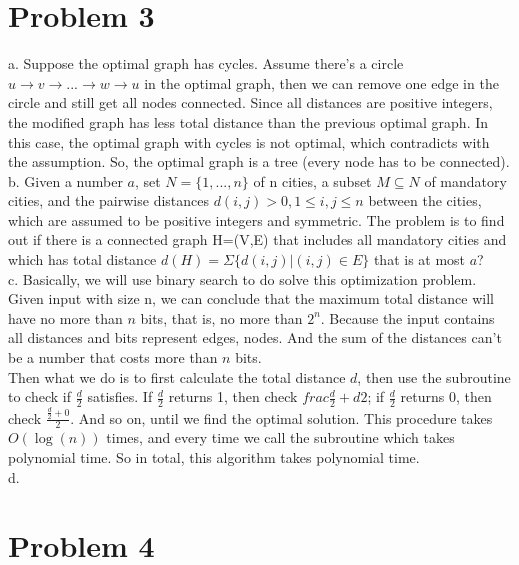 \documentclass[12pt]{article}
\begin{document}
\section*{Problem 3}

a. Suppose the optimal graph has cycles. Assume there's a circle $u
\to v \to ... \to w \to u$ in the optimal graph, then we can remove
one edge in the circle and still get all nodes connected. Since all
distances are positive integers, the modified graph has less total
distance than the previous optimal graph. In this case, the optimal
graph with cycles is not optimal, which contradicts with the
assumption. So, the optimal graph is a tree (every node has to be
connected). \\

b. Given a number $a$, set $N = \{1,...,n\}$ of n cities, a subset $M
\subseteq N$ of mandatory cities, and the pairwise distances
$d(i,j)>0, 1 \le i,j \le n$ between the cities, which are assumed to
be positive integers and symmetric. The problem is to find out if
there is a connected graph H=(V,E) that includes all mandatory cities
and which has total distance $d(H) = \Sigma \{d(i,j)|(i,j) \in
E \}$ that is at most $a$? \\

c. Basically, we will use binary search to do solve this optimization
problem. \\

Given input with size n, we can conclude that the maximum total
distance will have no more than $n$ bits, that is, no more than
$2^n$. Because the input contains all distances and bits represent
edges, nodes. And the sum of the distances can't be a number that
costs more than $n$ bits. \\

Then what we do is to first calculate the total distance $d$, then use
the subroutine to check if $\frac {d}{2}$ satisfies. If $\frac {d}{2}$
returns 1, then check $frac {\frac {d}{2} + d}{2}$; if $\frac {d}{2}$
returns 0, then check $\frac {\frac {d}{2} + 0}{2}$. And so on, until
we find the optimal solution. This procedure takes $O(\log {(n)})$
times, and every time we call the subroutine which takes polynomial
time. So in total, this algorithm takes polynomial time. \\

d. 


\section*{Problem 4}
\end{document}
